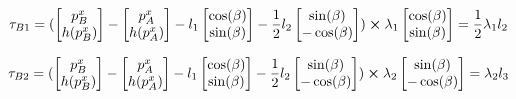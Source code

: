 \documentclass[10pt]{article}
\begin{document}
\[
\tau_{B1} = 
(
\begin{bmatrix}
p_B^x \\
h(p_B^x)
\end{bmatrix}
-
\begin{bmatrix}
p_A^x \\
h(p_A^x)
\end{bmatrix}
-
l_1
\begin{bmatrix}
\cos(\beta) \\
\sin(\beta)
\end{bmatrix}
-
\frac{1}{2} l_2
\begin{bmatrix}
\sin(\beta) \\
-\cos(\beta)
\end{bmatrix}
) 
\cross
\lambda_1
\begin{bmatrix}
  \cos(\beta) \\
  \sin(\beta)
\end{bmatrix}
=
\frac{1}{2}\lambda_1 l_2
\]

\[
\tau_{B2} = 
(
\begin{bmatrix}
p_B^x \\
h(p_B^x)
\end{bmatrix}
-
\begin{bmatrix}
p_A^x \\
h(p_A^x)
\end{bmatrix}
-
l_1
\begin{bmatrix}
\cos(\beta) \\
\sin(\beta)
\end{bmatrix}
-
\frac{1}{2} l_2
\begin{bmatrix}
\sin(\beta) \\
-\cos(\beta)
\end{bmatrix}
) 
\cross
\lambda_2
\begin{bmatrix}
  \sin(\beta) \\
  - \cos(\beta)
\end{bmatrix}
=
\lambda_2l_3 
\]
\end{document}
